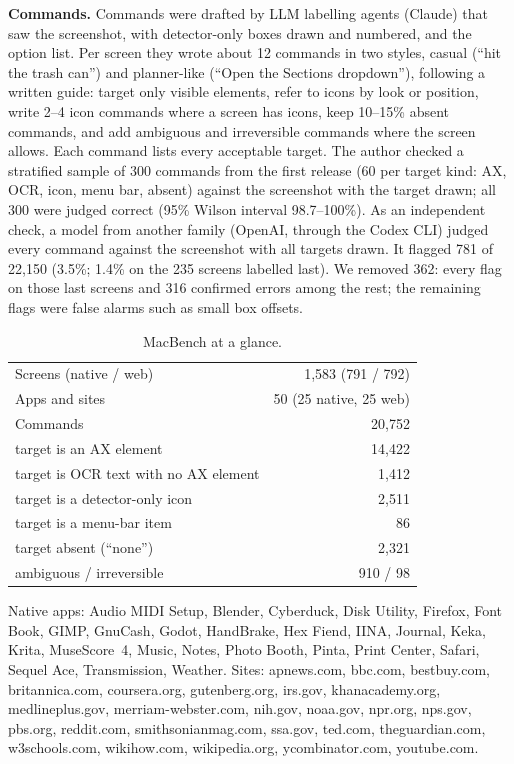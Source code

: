 \documentclass[sigconf,screen,review]{acmart}
\newcommand{\bench}{MacBench}
\begin{document}
\textbf{Commands.} Commands were drafted by LLM labelling agents (Claude) that saw the screenshot, with detector-only boxes drawn and numbered, and the option list. Per screen they wrote about 12 commands in two styles, casual (``hit the trash can'') and planner-like (``Open the Sections dropdown''), following a written guide: target only visible elements, refer to icons by look or position, write 2--4 icon commands where a screen has icons, keep 10--15\% absent commands, and add ambiguous and irreversible commands where the screen allows. Each command lists every acceptable target. The author checked a stratified sample of 300 commands from the first release (60 per target kind: AX, OCR, icon, menu bar, absent) against the screenshot with the target drawn; all 300 were judged correct (95\% Wilson interval 98.7--100\%). As an independent check, a model from another family (OpenAI, through the Codex CLI) judged every command against the screenshot with all targets drawn. It flagged 781 of 22,150 (3.5\%; 1.4\% on the 235 screens labelled last). We removed 362: every flag on those last screens and 316 confirmed errors among the rest; the remaining flags were false alarms such as small box offsets.

\begin{table}[t]
\caption{\bench{} at a glance.}
\label{tab:stats}
\small
\begin{tabular}{@{}lr@{}}
\toprule
Screens (native / web) & 1,583 (791 / 792) \\
Apps and sites & 50 (25 native, 25 web) \\
Commands & 20,752 \\
\quad target is an AX element & 14,422 \\
\quad target is OCR text with no AX element & 1,412 \\
\quad target is a detector-only icon & 2,511 \\
\quad target is a menu-bar item & 86 \\
\quad target absent (``none'') & 2,321 \\
\quad ambiguous / irreversible & 910 / 98 \\
\bottomrule
\end{tabular}

\vspace{2pt}
\footnotesize Native apps: Audio MIDI Setup, Blender, Cyberduck, Disk Utility, Firefox, Font Book, GIMP, GnuCash, Godot, HandBrake, Hex Fiend, IINA, Journal, Keka, Krita, MuseScore~4, Music, Notes, Photo Booth, Pinta, Print Center, Safari, Sequel Ace, Transmission, Weather. Sites: apnews.com, bbc.com, bestbuy.com, britannica.com, coursera.org, gutenberg.org, irs.gov, khanacademy.org, medlineplus.gov, merriam-webster.com, nih.gov, noaa.gov, npr.org, nps.gov, pbs.org, reddit.com, smithsonianmag.com, ssa.gov, ted.com, theguardian.com, w3schools.com, wikihow.com, wikipedia.org, ycombinator.com, youtube.com.
\end{table}
\end{document}
